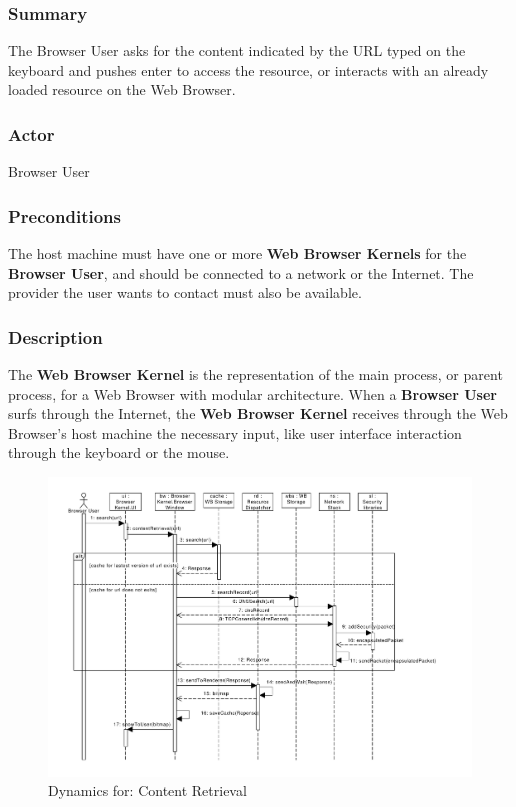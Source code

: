 \documentclass[prodmode,hillsideplop]{acmlarge}
\begin{document}
\subsubsection{Summary}
The Browser User asks for the content indicated by the URL typed on the keyboard and pushes enter to access the resource, or interacts with an already loaded resource on the Web Browser.

\subsubsection{Actor}
Browser User

\subsubsection{Preconditions}
The host machine must have one or more \textbf{Web Browser Kernels} for the \textbf{Browser User}, and should be connected to a network or the Internet. The provider the user wants to contact must also be available.

\subsubsection{Description}
The \textbf{Web Browser Kernel} is the representation of the main process, or parent process, for a Web Browser with modular architecture. When a \textbf{Browser User} surfs through the Internet, the \textbf{Web Browser Kernel} receives through the Web Browser’s host machine the necessary input, like user interface interaction through the keyboard or the mouse.

\begin{figure}[h!t]
  \centering
  \hspace{-2cm}
  \includegraphics[scale=0.63]{imgs/contentRetrieval.pdf}
  \caption{Dynamics for: Content Retrieval}
  \label{fig:BK}
\end{figure}
\end{document}

